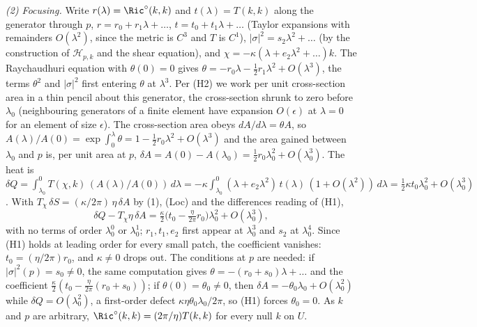 \emph{(2) Focusing.} Write $r(\lambda) = \Ric^{\circ}(k,k)$ and $t(\lambda) = T(k,k)$ along the generator through $p$, $r = r_{0} + r_{1}\lambda + \dots$, $t = t_{0} + t_{1}\lambda + \dots$ (Taylor expansions with remainders $O(\lambda^{2})$, since the metric is $C^{3}$ and $T$ is $C^{1}$), $|\sigma|^{2} = s_{2}\lambda^{2} + \dots$ (by the construction of $\mathcal{H}_{p,k}$ and the shear equation), and $\chi = -\kappa(\lambda + e_{2}\lambda^{2} + \dots)k$. The Raychaudhuri equation with $\theta(0) = 0$ gives $\theta = -r_{0}\lambda - \tfrac12 r_{1}\lambda^{2} + O(\lambda^{3})$, the terms $\theta^{2}$ and $|\sigma|^{2}$ first entering $\theta$ at $\lambda^{3}$. Per (H2) we work per unit cross-section area in a thin pencil about this generator, the cross-section shrunk to zero before $\lambda_{0}$ (neighbouring generators of a finite element have expansion $O(\epsilon)$ at $\lambda = 0$ for an element of size $\epsilon$). The cross-section area obeys $dA/d\lambda = \theta A$, so $A(\lambda)/A(0) = \exp\int_{0}^{\lambda}\theta = 1 - \tfrac12 r_{0}\lambda^{2} + O(\lambda^{3})$ and the area gained between $\lambda_{0}$ and $p$ is, per unit area at $p$, $\delta A = A(0) - A(\lambda_{0}) = \tfrac12 r_{0}\lambda_{0}^{2} + O(\lambda_{0}^{3})$. The heat is $\delta Q = \int_{\lambda_{0}}^{0} T(\chi,k)\,(A(\lambda)/A(0))\,d\lambda = -\kappa\int_{\lambda_{0}}^{0}(\lambda + e_{2}\lambda^{2})\,t(\lambda)\,(1 + O(\lambda^{2}))\,d\lambda = \tfrac12\kappa t_{0}\lambda_{0}^{2} + O(\lambda_{0}^{3})$. With $T_{\chi}\,\delta S = (\kappa/2\pi)\,\eta\,\delta A$ by (1), (Loc) and the differences reading of (H1),
\[
\delta Q - T_{\chi}\eta\,\delta A = \tfrac{\kappa}{2}\big(t_{0} - \tfrac{\eta}{2\pi}r_{0}\big)\lambda_{0}^{2} + O(\lambda_{0}^{3}),
\]
with no terms of order $\lambda_{0}^{0}$ or $\lambda_{0}^{1}$; $r_{1}, t_{1}, e_{2}$ first appear at $\lambda_{0}^{3}$ and $s_{2}$ at $\lambda_{0}^{4}$. Since (H1) holds at leading order for every small patch, the coefficient vanishes: $t_{0} = (\eta/2\pi)r_{0}$, and $\kappa \neq 0$ drops out. The conditions at $p$ are needed: if $|\sigma|^{2}(p) = s_{0} \neq 0$, the same computation gives $\theta = -(r_{0} + s_{0})\lambda + \dots$ and the coefficient $\tfrac{\kappa}{2}(t_{0} - \tfrac{\eta}{2\pi}(r_{0} + s_{0}))$; if $\theta(0) = \theta_{0} \neq 0$, then $\delta A = -\theta_{0}\lambda_{0} + O(\lambda_{0}^{2})$ while $\delta Q = O(\lambda_{0}^{2})$, a first-order defect $\kappa\eta\theta_{0}\lambda_{0}/2\pi$, so (H1) forces $\theta_{0} = 0$. As $k$ and $p$ are arbitrary, $\Ric^{\circ}(k,k) = (2\pi/\eta)T(k,k)$ for every null $k$ on $U$.

